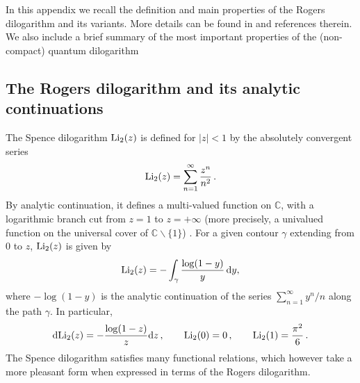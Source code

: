 \documentclass[12pt,reqno]{article}
\numberwithin{equation}{section}
\newcommand{\be}{\begin{equation}}
\newcommand{\ee}{\end{equation}}
\newcommand{\de}{\mathrm{d}}
\newcommand{\IC}{\mathbb{C}}
\numberwithin{equation}{section}
\begin{document}
In this appendix we recall the definition and main properties of the Rogers dilogarithm
and its variants. More details can be found in \cite{MR2290758,Nahm:2004ch}
and references therein. We also include a brief summary of the most important properties of
the (non-compact) quantum dilogarithm

\subsection{The Rogers dilogarithm and its analytic continuations}

The Spence dilogarithm ${\rm Li}_2(z)$ is defined for $|z|<1$ by the absolutely convergent series
\be
{\rm Li}_2(z) = \sum_{n=1}^{\infty} \frac{z^n}{n^2}\, .
\ee
By analytic continuation, it defines a multi-valued function on $\IC$,
with a logarithmic branch cut  from $z=1$ to $z=+\infty$ (more precisely,
a univalued function on the universal cover of $\IC\backslash\{1\}$) . For a given contour
$\gamma$ extending from $0$ to $z$, $  {\rm Li}_2(z)$ is given by
\be
 {\rm Li}_2(z) = -\int_{\gamma} \frac{\log(1-y)}{y} \, \de y,
\ee
where $-\log(1-y)$ is the analytic continuation of the series $\sum_{n=1}^{\infty} y^n/n$
along the path $\gamma$. In particular,
\be
\label{dLi2z}
\de  {\rm Li}_2(z) = - \frac{\log(1-z)}{z} \de z\, ,
\qquad
{\rm Li_2}(0)=0\, ,
\qquad
{\rm Li_2}(1)=\frac{\pi^{2}}{6}\, .
\ee
The Spence dilogarithm satisfies many functional relations, which however take a more
pleasant form when expressed in terms of the Rogers dilogarithm.
\end{document}
